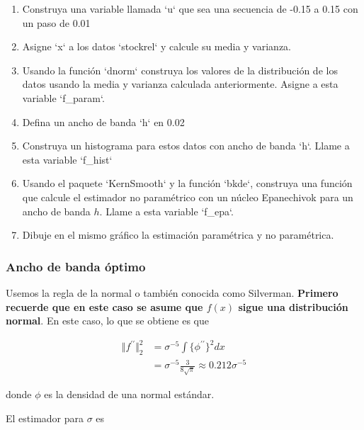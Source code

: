 \documentclass[12pt]{book}\usepackage[]{graphicx}\usepackage[]{color}
\theoremstyle{definition}
\theoremstyle{plain}
\begin{document}
 \begin{pregunta}{}{}

 \begin{enumerate}
 \item Construya una variable llamada `u` que sea una secuencia de -0.15 a 0.15 con un paso de 0.01
 \item Asigne `x` a los datos `stockrel` y calcule su media y varianza.
 \item Usando la función `dnorm` construya los valores de la distribución de los datos usando la media y varianza calculada anteriormente. Asigne a esta variable `f\_param`.
 \item Defina un ancho de banda `h` en 0.02
 \item Construya un histograma para estos datos con ancho de banda `h`. Llame a esta variable `f\_hist`
 \item Usando el paquete `KernSmooth` y la función `bkde`, construya una función que calcule el estimador no paramétrico con un núcleo Epanechivok para un ancho de banda  $h$.  Llame a esta variable `f\_epa`.
 \item Dibuje en el mismo gráfico la estimación paramétrica y no paramétrica.
 \end{enumerate}
 \end{pregunta}

 \begin{solucion}{}{}


 \end{solucion}

 \subsubsection{Ancho de banda óptimo}

 Usemos la regla de la normal o también conocida como Silverman.
 \textbf{Primero recuerde que en este caso se asume que $f(x)$ sigue una distribución normal}. En este caso, lo que se obtiene es que

 \begin{align*}
 \Vert f^{\prime \prime} \Vert_2^2 & = \sigma ^{-5} \int \{\phi^{\prime \prime}\}^2 dx              \\
 & = \sigma ^{-5} \frac{3}{8\sqrt{\pi}} \approx 0.212 \sigma^{-5}
 \end{align*}

 donde $\phi$ es la densidad de una normal estándar.

 El estimador para $\sigma$ es
\end{document}
